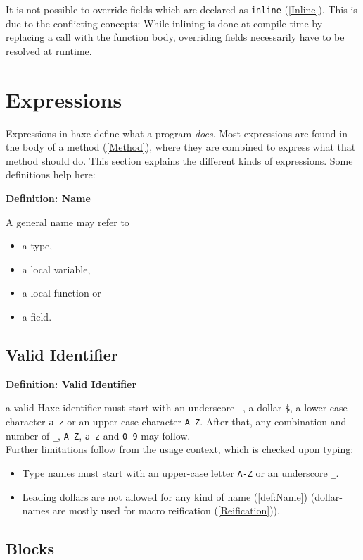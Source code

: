 \documentclass{article}
\newcommand{\expr}[1]{\texttt{#1}}
\newenvironment{myshaded}
  {\def\FrameCommand{\fboxsep=\topsep\colorbox{bgcolor}}%
  \MakeFramed {\advance\hsize-\width \FrameRestore}}%
 {\endMakeFramed}
\newcommand{\define}[3][Definition]
	{\begin{myshaded}\noindent\textbf{#1: #2}\par\nobreak\noindent\ignorespaces#3\label{def:#2}\end{myshaded}}
\newcommand{\tref}[2]{#1 (\ref{#2})}
\begin{document}
It is not possible to override fields which are declared as \tref{\expr{inline}}{Inline}. This is due to the conflicting concepts: While inlining is done at compile-time by replacing a call with the function body, overriding fields necessarily have to be resolved at runtime.


\section{Expressions}
\label{Expressions}
Expressions in haxe define what a program \emph{does}. Most expressions are found in the body of a \tref{method}{Method}, where they are combined to express what that method should do. This section explains the different kinds of expressions. Some definitions help here:

\define{Name}{A general name may refer to
\begin{itemize}
	\item a type,
	\item a local variable,
	\item a local function or
	\item a field.
\end{itemize}}

\subsection{Valid Identifier}
\label{Valid Identifier}
\define{Valid Identifier}{a valid Haxe identifier must start with an underscore \expr{_}, a dollar \expr{\$}, a lower-case character \expr{a-z} or an upper-case character \expr{A-Z}. After that, any combination and number of \expr{_}, \expr{A-Z}, \expr{a-z} and \expr{0-9} may follow.\\
Further limitations follow from the usage context, which is checked upon typing:
\begin{itemize}
	\item Type names must start with an upper-case letter \expr{A-Z} or an underscore \expr{_}.
	\item Leading dollars are not allowed for any kind of \tref{name}{def:Name} (dollar-names are mostly used for \tref{macro reification}{Reification}).
\end{itemize}}



\subsection{Blocks}
\end{document}
